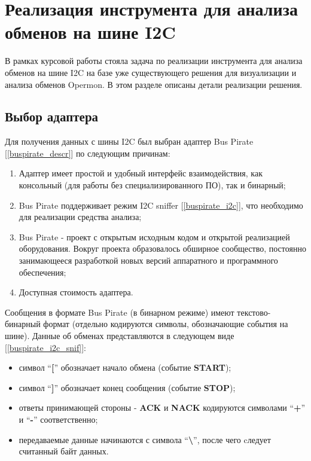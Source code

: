 \section{Реализация инструмента для анализа обменов на шине I2C}

В рамках курсовой работы стояла задача по реализации инструмента для анализа обменов на шине I2C на базе уже существующего решения для визуализации и анализа обменов Opermon. В этом разделе описаны детали реализации решения.

\subsection{Выбор адаптера}

Для получения данных с шины I2C был выбран адаптер Bus Pirate [\ref{buspirate_descr}] по следующим причинам:

\begin{enumerate}
 \item Адаптер имеет простой и удобный интерфейс взаимодействия, как консольный (для работы без специализированного ПО), так и бинарный;
 \item Bus Pirate поддерживает режим I2C sniffer [\ref{buspirate_i2c}], что необходимо для реализации средства анализа;
 \item Bus Pirate - проект с открытым исходным кодом и открытой реализацией оборудования. Вокруг проекта образовалось обширное сообщество, постоянно занимающееся разработкой новых версий аппаратного и программного обеспечения;
 \item Доступная стоимость адаптера.
\end{enumerate}

Сообщения в формате Bus Pirate (в бинарном режиме) имеют текстово-бинарный формат (отдельно кодируются символы, обозначающие события на шине). Данные об обменах представляются в следующем виде [\ref{buspirate_i2c_snif}]:

\begin{itemize}
 \item символ ``\textbf{[}'' обозначает начало обмена (событие \textbf{START});
 \item символ ``\textbf{]}'' обозначает конец сообщения (событие \textbf{STOP});
 \item ответы принимающей стороны - \textbf{ACK} и \textbf{NACK} кодируются символами ``\textbf{+}'' и ``\textbf{-}'' соответственно;
 \item передаваемые данные начинаются с символа ``\textbf{\textbackslash}'', после чего cледует считанный байт данных.
\end{itemize}

